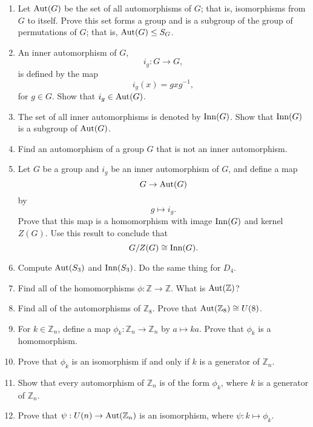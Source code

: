  
{\small
\begin{enumerate}
 
 
\item
Let $\operatorname{Aut}(G)$ be the set of all automorphisms of $G$; that is,
isomorphisms from $G$ to itself. Prove this set forms a group and is a
subgroup of the group of permutations of $G$; that is, $\operatorname{Aut}(G) \leq S_G$. 
 
 
\item
An {\bfi inner automorphism\/} of $G$,
\[
i_g : G \rightarrow G,
\]
is defined by the map
\[
i_g(x) = g x g^{-1},
\]
for $g \in G$. Show that $i_g \in \operatorname{Aut}(G)$.
 
 
\item
The set of all inner automorphisms is denoted by $\operatorname{Inn}(G)$. Show that
$\operatorname{Inn}(G)$ is a subgroup of $\operatorname{Aut}(G)$. 
 
 
\item
Find an automorphism of a group $G$ that is not an inner automorphism.
 
 
\item
Let $G$ be a group and $i_g$ be an inner automorphism of $G$, and
define a map 
\[
G \rightarrow \operatorname{Aut}(G)
\]
by
\[
g \mapsto i_g.
\]
Prove that this map is a homomorphism with image $\operatorname{Inn}(G)$ and kernel
$Z(G)$. Use this result to conclude that 
\[
G/Z(G) \cong \operatorname{Inn}(G).
\]
 
 
\item
Compute $\operatorname{Aut}(S_3)$ and $\operatorname{Inn}(S_3)$.  Do the same thing for $D_4$.
 
 
\item
Find all of the homomorphisms $\phi : {\mathbb Z} \rightarrow {\mathbb Z}$.
What is $\operatorname{Aut}({\mathbb Z})$? 
 
 
\item
Find all of the automorphisms of ${\mathbb Z}_8$.  Prove that $\operatorname{Aut}({\mathbb
Z}_8) \cong U(8)$. 
 
 
\item
For $k \in {\mathbb Z}_n$, define a map $\phi_k : {\mathbb Z}_n \rightarrow
{\mathbb Z}_n$ by $a \mapsto ka$.  Prove that $\phi_k$ is a homomorphism. 
 
 
\item
Prove that $\phi_k$ is an isomorphism if and only if $k$ is a generator
of ${\mathbb Z}_n$. 
 
 
\item
Show that every automorphism of ${\mathbb Z}_n$ is of the form $\phi_k$,
where $k$ is a generator of ${\mathbb Z}_n$. 
 
 
\item
Prove that $\psi : U(n) \rightarrow \operatorname{Aut}({\mathbb Z}_n)$ is an
isomorphism, where $\psi : k \mapsto \phi_k$. 
 
 
\end{enumerate}
}

\sagesection
 
 
 
 
